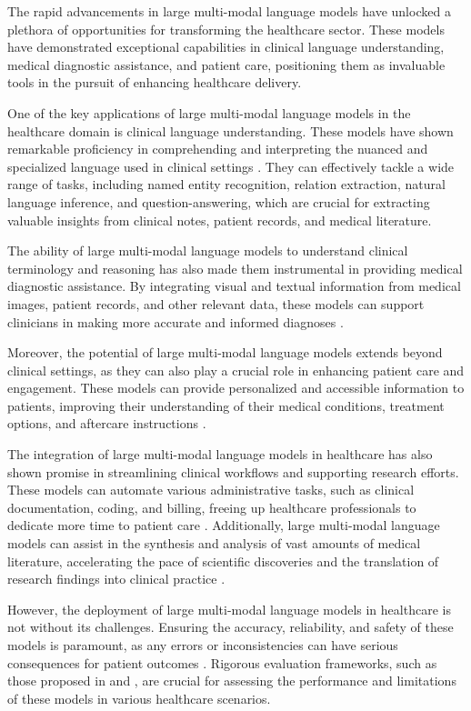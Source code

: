 \documentclass[11pt]{article}
\begin{document}
The rapid advancements in large multi-modal language models have unlocked a plethora of opportunities for transforming the healthcare sector. These models have demonstrated exceptional capabilities in clinical language understanding, medical diagnostic assistance, and patient care, positioning them as invaluable tools in the pursuit of enhancing healthcare delivery.

One of the key applications of large multi-modal language models in the healthcare domain is clinical language understanding. These models have shown remarkable proficiency in comprehending and interpreting the nuanced and specialized language used in clinical settings \cite{ref188,ref189,ref190}. They can effectively tackle a wide range of tasks, including named entity recognition, relation extraction, natural language inference, and question-answering, which are crucial for extracting valuable insights from clinical notes, patient records, and medical literature.

The ability of large multi-modal language models to understand clinical terminology and reasoning has also made them instrumental in providing medical diagnostic assistance. By integrating visual and textual information from medical images, patient records, and other relevant data, these models can support clinicians in making more accurate and informed diagnoses \cite{ref191,ref192,ref193}.

Moreover, the potential of large multi-modal language models extends beyond clinical settings, as they can also play a crucial role in enhancing patient care and engagement. These models can provide personalized and accessible information to patients, improving their understanding of their medical conditions, treatment options, and aftercare instructions \cite{ref194,ref195,ref196}.

The integration of large multi-modal language models in healthcare has also shown promise in streamlining clinical workflows and supporting research efforts. These models can automate various administrative tasks, such as clinical documentation, coding, and billing, freeing up healthcare professionals to dedicate more time to patient care \cite{ref70}. Additionally, large multi-modal language models can assist in the synthesis and analysis of vast amounts of medical literature, accelerating the pace of scientific discoveries and the translation of research findings into clinical practice \cite{ref197}.

However, the deployment of large multi-modal language models in healthcare is not without its challenges. Ensuring the accuracy, reliability, and safety of these models is paramount, as any errors or inconsistencies can have serious consequences for patient outcomes \cite{ref198}. Rigorous evaluation frameworks, such as those proposed in \cite{ref188} and \cite{ref193}, are crucial for assessing the performance and limitations of these models in various healthcare scenarios.
\end{document}
